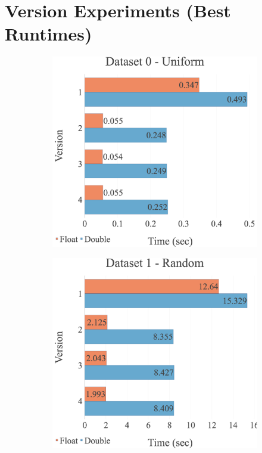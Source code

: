 \label{appendix:experiments:cudaoption}

\section{Version Experiments (Best Runtimes)}
\label{experiments:cudaoption:version}
\begin{figure}[H]
\begin{adjustwidth}{-2cm}{-2cm}
\centering
\begin{subfigure}{.62\textwidth}
    \centering
    \includegraphics[width=1\textwidth]{img/experiments/option-versions-0_UNIFORM.png}
\end{subfigure}
\begin{subfigure}{.62\textwidth}
    \centering
    \includegraphics[width=1\textwidth]{img/experiments/option-versions-1_RAND.png}

\end{subfigure}
\end{adjustwidth}
\end{figure}
